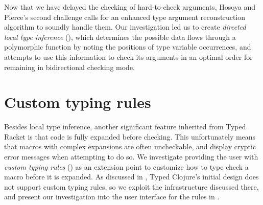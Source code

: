 Now that we have delayed the checking of hard-to-check arguments,
Hosoya and Pierce's second challenge calls for an enhanced
type argument reconstruction algorithm to soundly handle
them.
Our investigation led us to create \emph{directed local type inference}
(),
which determines the possible data flows through a polymorphic function
by noting the positions of type variable occurrences, and attempts to
use this information to check its arguments in an optimal order for remaining
in bidirectional checking mode.

\section{Custom typing rules}

Besides local type inference,
another significant feature inherited from Typed Racket is that
code is fully expanded before checking.
This unfortunately means that macros with complex expansions
are often uncheckable, and display cryptic error messages when attempting
to do so.
We investigate providing the user with \emph{custom typing rules} ()
as an extension point to customize how to type check a macro before
it is expanded.
As discussed in 
, Typed Clojure's initial design does
not support custom typing rules, so we exploit the infrastructure
discussed there,
and present our investigation into the user interface for the rules in
.



